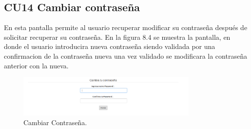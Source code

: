 \subsection{CU14 Cambiar contraseña}
{
\justify
{}
}
\justify
En esta pantalla permite al usuario recuperar modificar su contraseña después de solicitar recuperar su contraseña.
{
\justify
{}
}
\justify
En la figura 8.4 se muestra la pantalla, en donde el usuario introducira nueva contraseña siendo validada por una confirmacion de la contraseña nueva una vez validado se modificara la contraseña anterior con la nueva.

\begin{figure}[htb]
\centering
\includegraphics[width=0.8\textwidth]{./images/cu15-cambiar-contrasena.png}
\caption{Cambiar Contraseña.} \label{fig:horizonte}
\end{figure}
